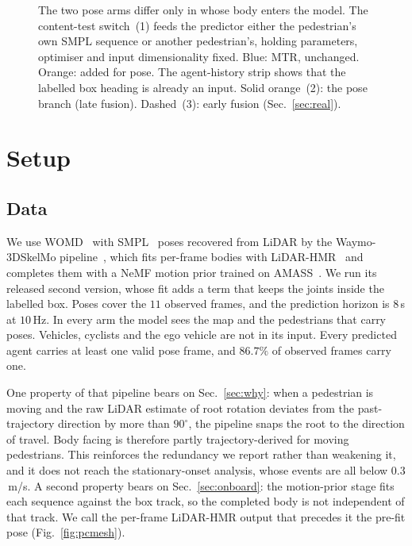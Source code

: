 \documentclass[conference]{IEEEtran}
\begin{document}
\begin{figure}[t]
\centering
\resizebox{0.92\textwidth}{!}{}
\caption{The two pose arms differ only in whose body enters the model. The
content-test switch~(1) feeds the predictor either the pedestrian's own SMPL
sequence or another pedestrian's, holding parameters, optimiser and input
dimensionality fixed. Blue: MTR, unchanged. Orange: added for pose. The
agent-history strip shows that the labelled box heading is already an
input. Solid orange~(2): the pose branch (late fusion). Dashed~(3): early fusion
(Sec.~\ref{sec:real}).}
\label{fig:arch}
\end{figure}

\section{Setup}
\label{sec:setup}

\subsection{Data}
We use WOMD~\cite{ettinger2021waymo} with SMPL~\cite{loper2015smpl} poses
recovered from LiDAR by the Waymo-3DSkelMo pipeline~\cite{zhu2025waymo3dskelmo},
which fits per-frame bodies with LiDAR-HMR~\cite{fan2023lidarhmr} and completes
them with a NeMF motion prior trained on
AMASS~\cite{he2022nemf,mahmood2019amass}. We run its released second
version, whose fit adds a term that keeps the joints inside the labelled box.
Poses cover the $11$
observed frames, and the prediction horizon is $8$\,s at $10$\,Hz. In every
arm the model sees the map and the pedestrians that carry poses. Vehicles,
cyclists and the ego vehicle are not in its input. Every predicted agent
carries at least one valid pose frame, and $86.7\%$ of observed frames carry
one.

One property of that pipeline bears on Sec.~\ref{sec:why}: when a pedestrian is
moving and the raw LiDAR estimate of root rotation deviates from the
past-trajectory direction by more than $90^\circ$, the pipeline snaps the root to
the direction of travel. Body facing is therefore partly trajectory-derived for
moving pedestrians. This reinforces the redundancy we report rather than
weakening it, and it does not reach the stationary-onset analysis, whose events
are all below $0.3$\,m/s. A second property bears on Sec.~\ref{sec:onboard}: the
motion-prior stage fits each sequence against the box track, so the completed
body is not independent of that track. We call the per-frame LiDAR-HMR output
that precedes it the pre-fit pose (Fig.~\ref{fig:pcmesh}).
\end{document}
